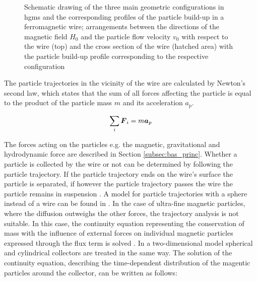 \begin{figure}[h]
\centering

\caption[Geometric configurations in \gls{hgms} and particle build-up]{Schematic drawing of the three main geometric configurations in \gls{hgms} and the corresponding profiles of the particle build-up in a ferromagnetic wire; arrangements between the directions of the magnetic field $H_{0}$ and the particle flow velocity $v_{0}$ with respect to the wire (top) and the cross section of the wire (hatched area) with the particle build-up profile corresponding to the respective configuration \cite{svoboda2004magnetic}
\label{fig:hgms_config}
}
\end{figure}

The particle trajectories in the vicinity of the wire are calculated by Newton's second law, which states that the sum of all forces affecting the particle is equal to the product of the particle mass $m$ and its acceleration $a_{p}$. 

\begin{equation}
\label{eq:mag_force}
\centering
\sum_{i}\boldsymbol{F}_{i} = m\boldsymbol{a}_{p}
\end{equation}
 
The forces acting on the particles e.g. the magnetic, gravitational and hydrodynamic force are described in Section \ref{subsec:bas_princ}. Whether a particle is collected by the wire or not can be determined by following the particle trajectory. If the particle trajectory ends on the wire's surface the particle is separated, if however the particle trajectory passes the wire the particle remains in suspension \cite{FranzrebHabil}. A model for particle trajectories with a sphere instead of a wire can be found in \cite{friedlaender1981particle}\cite{moyer1986filtration}. \newline 
In the case of ultra-fine magnetic particles, where the diffusion outweighs the other forces, the trajectory analysis is not suitable. In this case, the continuity equation representing the conservation of mass with the influence of external forces on individual magnetic particles expressed through the flux term is solved \cite{choomphon2017simulation}. In a two-dimensional model spherical and cylindrical collectors are treated in the same way. The solution of the continuity equation, describing the time-dependent distribution of the magentic particles around the collector, can be written as follows:     

